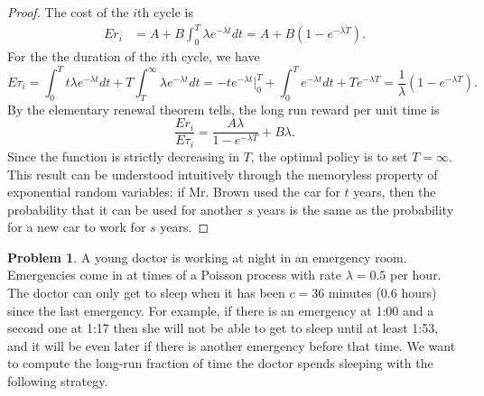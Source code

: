 \documentclass[oneside]{amsart}
\theoremstyle{definition}
\newtheorem{prob}{Problem}
\begin{document}
\begin{proof}
The cost of the $i$th cycle is 
\begin{align*}
	E r_i &= A + B  \int_0^T \lambda e^{-\lambda t} dt = A + B (1 - e^{-\lambda T}).
\end{align*}
For the the duration of the $i$th cycle, we have
\[
	E \tau_i = \int_0^T t \lambda e^{-\lambda t}dt  + T \int_T^\infty \lambda e^{-\lambda t}dt 
	= - t e^{-\lambda t} \Big|_0^T + \int_0^T  e^{-\lambda t}dt +  T e^{-\lambda T}
	= \frac{1}{\lambda} (1 - e^{-\lambda T}).
\]
By the elementary renewal theorem tells, the long run reward per unit time is 
\[
	\frac{E r_i}{E \tau_i} = \frac{A \lambda}{1 - e^{-\lambda T}}  + B\lambda.
\]
Since the function is strictly decreasing in $T$, the optimal policy is to set $T = \infty$. This result can be understood intuitively through the memoryless property of exponential random variables: if Mr. Brown used the car for $t$ years, then the probability that it can be used for another $s$ years is the same as the probability for a new car to work for $s$ years. 
\end{proof}

\begin{prob}
A young doctor is working at night in an emergency room. Emergencies come in at times of a Poisson process with rate $\lambda=0.5$ per hour. The doctor can only get to sleep when it has been $c = 36$ minutes (0.6 hours) since the last emergency. For example, if there is an emergency at 1:00 and a second one at 1:17 then she will not be able to get to sleep until at least 1:53, and it will be even later if there is another emergency before that time. We want to compute the long-run fraction of time the doctor spends sleeping with the following strategy.
\end{prob}
\end{document}
